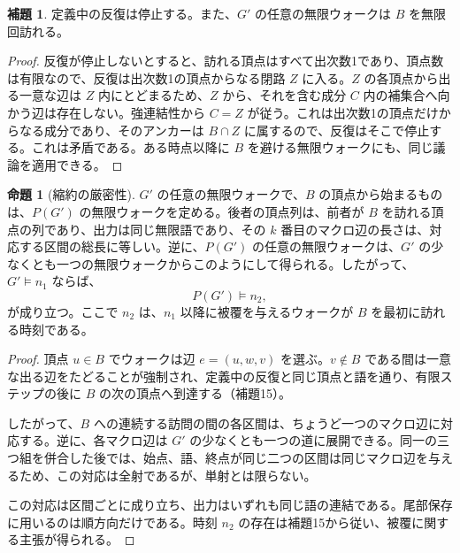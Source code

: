 \documentclass[11pt,reqno]{amsart}
\theoremstyle{definition}
\newtheorem{lemma}[theorem]{補題}
\newtheorem{proposition}[theorem]{命題}
\theoremstyle{definition}
\theoremstyle{remark}
\begin{document}
\begin{samepage}
\begin{lemma}\leavevmode\label{thm:15}
定義中の反復は停止する。また、\(G'\) の任意の無限ウォークは \(B\) を無限回訪れる。
\label{thm-end:15}
\end{lemma}
\end{samepage}

\begin{proof}\leavevmode\label{proof:15}
反復が停止しないとすると、訪れる頂点はすべて出次数1であり、頂点数は有限なので、反復は出次数1の頂点からなる閉路 \(Z\) に入る。\(Z\) の各頂点から出る一意な辺は \(Z\) 内にとどまるため、\(Z\) から、それを含む成分 \(C\) 内の補集合へ向かう辺は存在しない。強連結性から \(C=Z\) が従う。これは出次数1の頂点だけからなる成分であり、そのアンカーは \(B\cap Z\) に属するので、反復はそこで停止する。これは矛盾である。ある時点以降に \(B\) を避ける無限ウォークにも、同じ議論を適用できる。\qedhere
\end{proof}

\begin{samepage}
\begin{proposition}[縮約の厳密性]\leavevmode\label{thm:16}
\(G'\) の任意の無限ウォークで、\(B\) の頂点から始まるものは、\(P(G')\) の無限ウォークを定める。後者の頂点列は、前者が \(B\) を訪れる頂点の列であり、出力は同じ無限語であり、その \(k\) 番目のマクロ辺の長さは、対応する区間の総長に等しい。逆に、\(P(G')\) の任意の無限ウォークは、\(G'\) の少なくとも一つの無限ウォークからこのようにして得られる。したがって、\(G'\models n_1\) ならば、
\[
P(G')\models n_2,
\]
が成り立つ。ここで \(n_2\) は、\(n_1\) 以降に被覆を与えるウォークが \(B\) を最初に訪れる時刻である。
\label{thm-end:16}
\end{proposition}
\end{samepage}

\begin{proof}\leavevmode\label{proof:16}
頂点 \(u\in B\) でウォークは辺 \(e=(u,w,v)\) を選ぶ。\(v\notin B\) である間は一意な出る辺をたどることが強制され、定義中の反復と同じ頂点と語を通り、有限ステップの後に \(B\) の次の頂点へ到達する（補題15）。

したがって、\(B\) への連続する訪問の間の各区間は、ちょうど一つのマクロ辺に対応する。逆に、各マクロ辺は \(G'\) の少なくとも一つの道に展開できる。同一の三つ組を併合した後では、始点、語、終点が同じ二つの区間は同じマクロ辺を与えるため、この対応は全射であるが、単射とは限らない。

この対応は区間ごとに成り立ち、出力はいずれも同じ語の連結である。尾部保存に用いるのは順方向だけである。時刻 \(n_2\) の存在は補題15から従い、被覆に関する主張が得られる。\qedhere
\end{proof}
\end{document}
